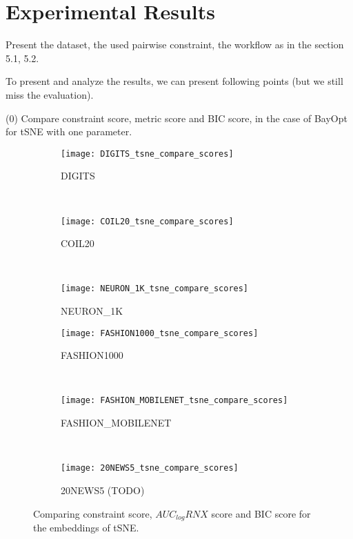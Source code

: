 \section{Experimental Results}

Present the dataset, the used pairwise constraint, the workflow as in the section 5.1, 5.2.

To present and analyze the results, we can present following points (but we still miss the evaluation).


(0) Compare constraint score, metric score and BIC score, in the case of BayOpt for tSNE with one parameter.

\begin{figure*}
\centering

\begin{subfigure}[b]{0.32\textwidth}
    \centering
    \texttt{[image: DIGITS\_tsne\_compare\_scores]}
    \caption{DIGITS}
\end{subfigure}
~
\begin{subfigure}[b]{0.32\textwidth}
    \texttt{[image: COIL20\_tsne\_compare\_scores]}
    \caption{COIL20}
\end{subfigure}
~
\begin{subfigure}[b]{0.32\textwidth}
    \texttt{[image: NEURON\_1K\_tsne\_compare\_scores]}
    \caption{NEURON\_1K}
\end{subfigure}

\vfill

\begin{subfigure}[b]{0.32\textwidth}
    \centering
    \texttt{[image: FASHION1000\_tsne\_compare\_scores]}
    \caption{FASHION1000}
\end{subfigure}
~
\begin{subfigure}[b]{0.32\textwidth}
    \texttt{[image: FASHION\_MOBILENET\_tsne\_compare\_scores]}
    \caption{FASHION\_MOBILENET}
\end{subfigure}
~
\begin{subfigure}[b]{0.32\textwidth}
    \texttt{[image: 20NEWS5\_tsne\_compare\_scores]}
    \caption{20NEWS5 (TODO)}
\end{subfigure}

\caption{Comparing constraint score, $AUC_{log}RNX$ score and BIC score for the embeddings of tSNE.}
\end{figure*}



